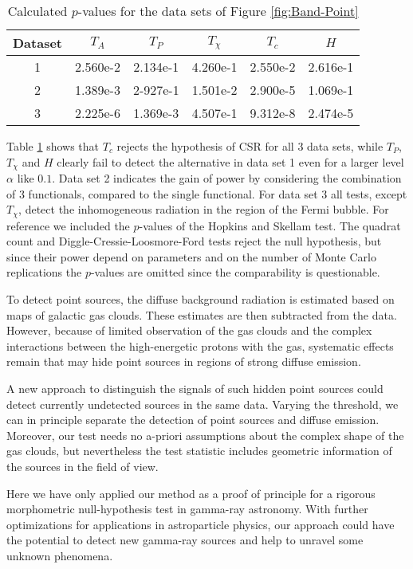 \documentclass[12pt]{article}
\begin{document}
\begin{table}[t]
\centering
\caption{Calculated $p$-values for the data sets of Figure \ref{fig:Band-Point}}\label{tab:real.data}
\renewcommand{\tabcolsep}{1.7mm}
\begin{tabular}{c|cccc|c}
Dataset & $T_A$ & $T_P$ & $T_\chi$ & $T_c$ & $H$ \\ \hline
1 & 2.560e-2 & 2.134e-1 & 4.260e-1 & 2.550e-2 & 2.616e-1 \\
2 & 1.389e-3 & 2-927e-1 & 1.501e-2 & 2.900e-5 & 1.069e-1 \\
3 & 2.225e-6 & 1.369e-3 & 4.507e-1 & 9.312e-8 & 2.474e-5 \\ \hline
\end{tabular}
\end{table}
Table \ref{tab:real.data} shows that $T_c$ rejects the hypothesis of CSR for all 3 data sets, while $T_P$, $T_\chi$ and $H$ clearly fail to detect the alternative in data set 1 even for a larger level $\alpha$ like $0.1$. Data set 2 indicates the gain of power by considering the combination of 3 functionals, compared to the single functional. For data set 3 all tests, except $T_\chi$, detect the inhomogeneous radiation in the region of the Fermi bubble. For reference we included the $p$-values of the Hopkins and Skellam test. The quadrat count and Diggle-Cressie-Loosmore-Ford tests reject the null hypothesis, but since their power depend on parameters and on the number of Monte Carlo replications the $p$-values are omitted since the comparability is questionable.

To detect point sources, the diffuse background radiation is estimated based on maps of galactic gas clouds.
These estimates are then subtracted from the data.
However, because of limited observation of the gas clouds and the complex interactions between the high-energetic protons with the gas, systematic effects remain that may hide point sources in regions of strong diffuse emission. 

A new approach to distinguish the signals of such hidden point sources could detect currently undetected sources in the same data.
%
Varying the threshold, we can in principle separate the detection of point sources and diffuse emission.
%
Moreover, our test needs no a-priori assumptions about the complex shape of the gas clouds, but nevertheless the test statistic includes geometric information of the sources in the field of view.

Here we have only applied our method as a proof of principle for a rigorous morphometric null-hypothesis test in gamma-ray astronomy.
With further optimizations for applications in astroparticle physics, our approach could have the potential to detect new gamma-ray sources and help to unravel some unknown phenomena.
\end{document}
